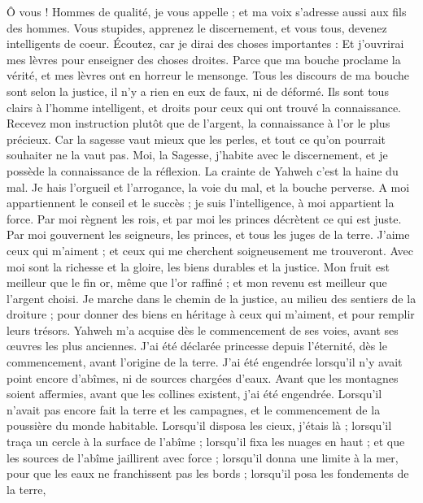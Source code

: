 \begin{multicols}{2}
Ô vous ! Hommes de qualité, je vous appelle ; et ma voix s'adresse aussi aux fils des hommes.
Vous stupides, apprenez le discernement, et vous tous, devenez intelligents de coeur.
Écoutez, car je dirai des choses importantes : Et j'ouvrirai mes lèvres pour enseigner des choses droites.
Parce que ma bouche proclame la vérité, et mes lèvres ont en horreur le mensonge.
Tous les discours de ma bouche sont selon la justice, il n'y a rien en eux de faux, ni de déformé.
Ils sont tous clairs à l'homme intelligent, et droits pour ceux qui ont trouvé la connaissance.
Recevez mon instruction plutôt que de l'argent, la connaissance à l'or le plus précieux.
Car la sagesse vaut mieux que les perles, et tout ce qu'on pourrait souhaiter ne la vaut pas.
Moi, la Sagesse, j'habite avec le discernement, et je possède la connaissance de la réflexion.
La crainte de Yahweh c'est la haine du mal. Je hais l'orgueil et l'arrogance, la voie du mal, et la bouche perverse.
A moi appartiennent le conseil et le succès ; je suis l'intelligence, à moi appartient la force.
Par moi règnent les rois, et par moi les princes décrètent ce qui est juste.
Par moi gouvernent les seigneurs, les princes, et tous les juges de la terre.
J'aime ceux qui m'aiment ; et ceux qui me cherchent soigneusement me trouveront.
Avec moi sont la richesse et la gloire, les biens durables et la justice.
Mon fruit est meilleur que le fin or, même que l'or raffiné ; et mon revenu est meilleur que l'argent choisi.
Je marche dans le chemin de la justice, au milieu des sentiers de la droiture ;
pour donner des biens en héritage à ceux qui m'aiment, et pour remplir leurs trésors.
Yahweh m'a acquise dès le commencement de ses voies, avant ses œuvres les plus anciennes.
J'ai été déclarée princesse depuis l'éternité, dès le commencement, avant l'origine de la terre.
J'ai été engendrée lorsqu'il n'y avait point encore d'abîmes, ni de sources chargées d'eaux.
Avant que les montagnes soient affermies, avant que les collines existent, j'ai été engendrée.
Lorsqu'il n'avait pas encore fait la terre et les campagnes, et le commencement de la poussière du monde habitable.
Lorsqu'il disposa les cieux, j'étais là ; lorsqu'il traça un cercle à la surface de l'abîme ;
lorsqu'il fixa les nuages en haut ; et que les sources de l'abîme jaillirent avec force ;
lorsqu'il donna une limite à la mer, pour que les eaux ne franchissent pas les bords ; lorsqu'il posa les fondements de la terre,

\end{multicols}
